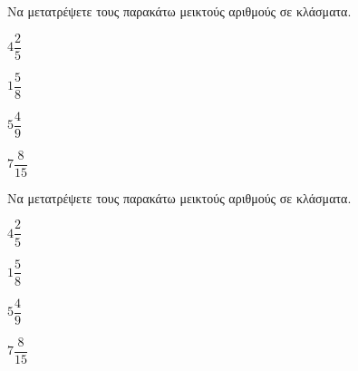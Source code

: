 Να μετατρέψετε τους παρακάτω μεικτούς αριθμούς σε κλάσματα.
\begin{multicols}{4}
\begin{rlist}
\item $ 4\dfrac{2}{5} $
\item $ 1\dfrac{5}{8} $
\item $ 5\dfrac{4}{9} $
\item $ 7\dfrac{8}{15} $
\end{rlist}
\end{multicols}
Να μετατρέψετε τους παρακάτω μεικτούς αριθμούς σε κλάσματα.
\begin{multicols}{4}
\begin{rlist}
\item $ 4\dfrac{2}{5} $
\item $ 1\dfrac{5}{8} $
\item $ 5\dfrac{4}{9} $
\item $ 7\dfrac{8}{15} $
\end{rlist}
\end{multicols}
